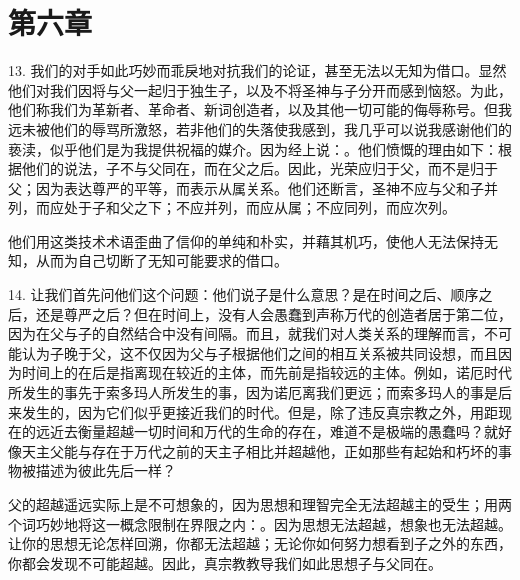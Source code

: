 
\section{第六章}

\par

13. 我们的对手如此巧妙而乖戾地对抗我们的论证，甚至无法以无知为借口。显然他们对我们因将与父一起归于独生子，以及不将圣神与子分开而感到恼怒。为此，他们称我们为革新者、革命者、新词创造者，以及其他一切可能的侮辱称号。但我远未被他们的辱骂所激怒，若非他们的失落使我感到，我几乎可以说我感谢他们的亵渎，似乎他们是为我提供祝福的媒介。因为经上说：。他们愤慨的理由如下：根据他们的说法，子不与父同在，而在父之后。因此，光荣应归于父，而不是归于父；因为表达尊严的平等，而表示从属关系。他们还断言，圣神不应与父和子并列，而应处于子和父之下；不应并列，而应从属；不应同列，而应次列。\par

他们用这类技术术语歪曲了信仰的单纯和朴实，并藉其机巧，使他人无法保持无知，从而为自己切断了无知可能要求的借口。\par

14. 让我们首先问他们这个问题：他们说子是什么意思？是在时间之后、顺序之后，还是尊严之后？但在时间上，没有人会愚蠢到声称万代的创造者居于第二位，因为在父与子的自然结合中没有间隔。而且，就我们对人类关系的理解而言，不可能认为子晚于父，这不仅因为父与子根据他们之间的相互关系被共同设想，而且因为时间上的在后是指离现在较近的主体，而先前是指较远的主体。例如，诺厄时代所发生的事先于索多玛人所发生的事，因为诺厄离我们更远；而索多玛人的事是后来发生的，因为它们似乎更接近我们的时代。但是，除了违反真宗教之外，用距现在的远近去衡量超越一切时间和万代的生命的存在，难道不是极端的愚蠢吗？就好像天主父能与存在于万代之前的天主子相比并超越他，正如那些有起始和朽坏的事物被描述为彼此先后一样？\par

父的超越遥远实际上是不可想象的，因为思想和理智完全无法超越主的受生；用两个词巧妙地将这一概念限制在界限之内：。因为思想无法超越，想象也无法超越。让你的思想无论怎样回溯，你都无法超越；无论你如何努力想看到子之外的东西，你都会发现不可能超越。因此，真宗教教导我们如此思想子与父同在。\par

